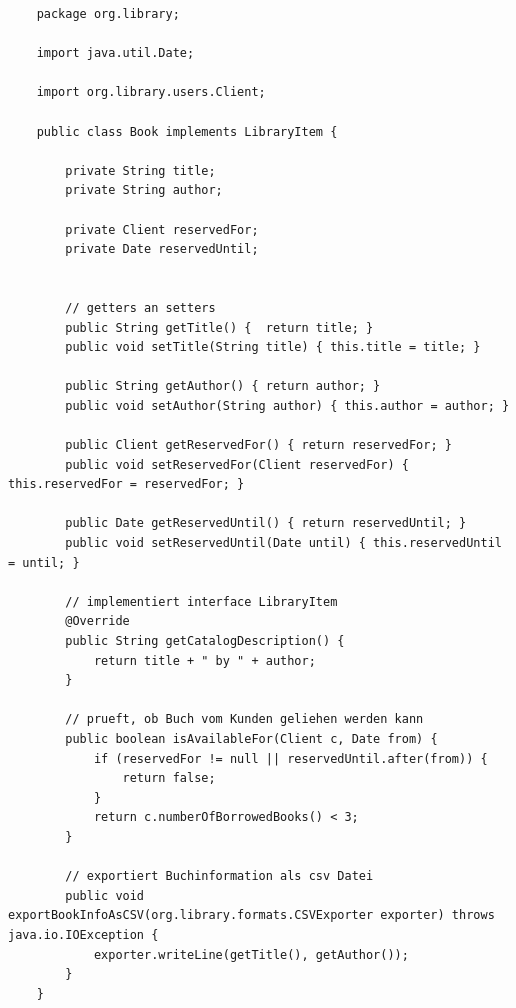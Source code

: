 \lstset{language=Java,
	showspaces=false,
	showtabs=false,
	breaklines=true,
	showstringspaces=false,
	breakatwhitespace=true,
}



\begin{lstlisting}
	package org.library;
	
	import java.util.Date;
	
	import org.library.users.Client;
	
	public class Book implements LibraryItem {
		
		private String title;
		private String author;
		
		private Client reservedFor;
		private Date reservedUntil;    
		
		
		// getters an setters
		public String getTitle() {  return title; }
		public void setTitle(String title) { this.title = title; }
		
		public String getAuthor() { return author; }
		public void setAuthor(String author) { this.author = author; }
		
		public Client getReservedFor() { return reservedFor; }
		public void setReservedFor(Client reservedFor) { this.reservedFor = reservedFor; }
		
		public Date getReservedUntil() { return reservedUntil; }
		public void setReservedUntil(Date until) { this.reservedUntil = until; }
		
		// implementiert interface LibraryItem
		@Override
		public String getCatalogDescription() {
			return title + " by " + author;  
		}
		
		// prueft, ob Buch vom Kunden geliehen werden kann
		public boolean isAvailableFor(Client c, Date from) {
			if (reservedFor != null || reservedUntil.after(from)) {
				return false;
			}
			return c.numberOfBorrowedBooks() < 3;
		}
		
		// exportiert Buchinformation als csv Datei
		public void exportBookInfoAsCSV(org.library.formats.CSVExporter exporter) throws java.io.IOException {        
			exporter.writeLine(getTitle(), getAuthor());        
		}    
	}
\end{lstlisting}

